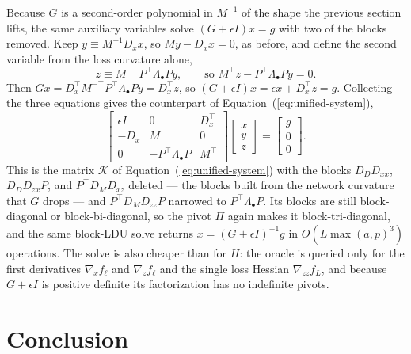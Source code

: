 \documentclass{article}
\newcommand{\K}{\mathcal{K}}
\begin{document}
Because $G$ is a second-order polynomial in $M^{-1}$ of the shape the previous
section lifts, the same auxiliary variables solve $(G + \epsilon I) x = g$ with
two of the blocks removed. Keep $y \equiv M^{-1} D_x x$, so $M y - D_x x = 0$, as
before, and define the second variable from the loss curvature alone,
\begin{equation}
  z \equiv M^{-\top} P^\top \Lambda_\bullet P y,
  \qquad \text{so } M^\top z - P^\top \Lambda_\bullet P y = 0.
\end{equation}
Then $G x = D_x^\top M^{-\top} P^\top \Lambda_\bullet P y = D_x^\top z$, so
$(G + \epsilon I) x = \epsilon x + D_x^\top z = g$. Collecting the three
equations gives the counterpart of Equation~(\ref{eq:unified-system}),
\begin{equation}
  \label{eq:ggn-system}
  \begin{bmatrix}
    \epsilon I & 0                         & D_x^\top \\
    -D_x       & M                         & 0        \\
    0          & -P^\top \Lambda_\bullet P & M^\top
  \end{bmatrix}
  \begin{bmatrix}
    x \\ y \\ z
  \end{bmatrix}
  =
  \begin{bmatrix}
    g \\ 0 \\ 0
  \end{bmatrix}.
\end{equation}
This is the matrix $\K$ of Equation~(\ref{eq:unified-system}) with the blocks
$D_D D_{xx}$, $D_D D_{zx} P$, and $P^\top D_M D_{xz}$ deleted --- the blocks
built from the network curvature that $G$ drops --- and $P^\top D_M D_{zz} P$
narrowed to $P^\top \Lambda_\bullet P$. Its blocks are still block-diagonal or
block-bi-diagonal, so the pivot $\Pi$ again makes it block-tri-diagonal, and the
same block-LDU solve returns $x = (G + \epsilon I)^{-1} g$ in
$O\left(L \max(a,p)^3\right)$ operations. The solve is also cheaper than for $H$:
the oracle is queried only for the first derivatives $\nabla_x f_\ell$ and
$\nabla_z f_\ell$ and the single loss Hessian $\nabla_{zz} f_L$, and because
$G + \epsilon I$ is positive definite its factorization has no indefinite pivots.

\section{Conclusion}
\end{document}
